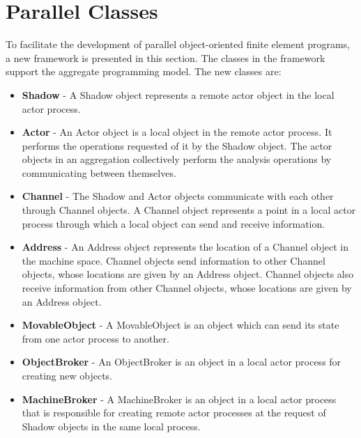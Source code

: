 \pagebreak


\pagebreak
\section{Parallel Classes}
To facilitate the development of parallel object-oriented finite
element programs, a new framework is presented in this section. The
classes in the framework support the aggregate programming model. The
new classes are:

\begin{itemize} 
\item {\bf Shadow} - A Shadow object represents a remote actor object
in the local actor process.

\item {\bf Actor} - An { Actor} object is a local object in the remote
actor process. It performs the operations requested of it by the
{ Shadow} object. The actor objects in an aggregation collectively
perform the analysis operations by communicating between themselves.

\item {\bf Channel} - The { Shadow} and { Actor} objects
communicate with 
each other through { Channel} objects. A { Channel} object represents a
point in a local actor process through which a local object can send
and receive information.

\item {\bf Address} - An { Address} object represents the location of a
{ Channel} object in the machine space. { Channel} objects send
information to other { Channel} objects, whose locations are given by
an { Address} object. { Channel} objects also receive
information from other { Channel} objects, whose locations are
given by an { Address} object.  

\item {\bf MovableObject} - A { MovableObject} is an object which can
send its state from one actor process to another.

\item {\bf ObjectBroker} - An { ObjectBroker} is an object in a local
actor process for creating new objects.

\item {\bf MachineBroker} - A { MachineBroker} is an object in a local
actor process that is responsible for creating remote actor processes
at the request of { Shadow} objects in the same local process.
\end{itemize}

\pagebreak





